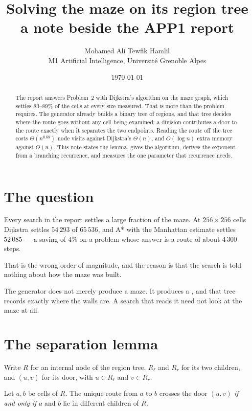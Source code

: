 \documentclass[11pt,a4paper]{article}
\title{Solving the maze on its region tree\\
       \large a note beside the APP1 report}
\author{Mohamed Ali Tewfik Hamlil\\[2pt]
  \small M1 Artificial Intelligence, Universit\'e Grenoble Alpes}
\date{\today}
\begin{document}
\maketitle

\begin{abstract}
The report answers Problem~2 with Dijkstra's algorithm on the maze graph, which
settles $83$--$89\%$ of the cells at every size measured. That is more than the
problem requires. The generator already builds a binary tree of regions, and
that tree decides where the route goes without any cell being examined: a
division contributes a door to the route exactly when it separates the two
endpoints. Reading the route off the tree costs $\Theta(n^{0.68})$ node visits
against Dijkstra's $\Theta(n)$, and $O(\log n)$ extra memory against
$\Theta(n)$. This note states the lemma, gives the algorithm, derives the
exponent from a branching recurrence, and measures the one parameter that
recurrence needs.
\end{abstract}

\section{The question}

Every search in the report settles a large fraction of the maze. At
$256\times256$ cells Dijkstra settles $54\,293$ of $65\,536$, and A* with the
Manhattan estimate settles $52\,085$ --- a saving of $4\%$ on a problem whose
answer is a route of about $4\,300$ steps.

That is the wrong order of magnitude, and the reason is that the search is told
nothing about how the maze was built.

\begin{keypoint}
The generator does not merely produce a maze. It produces a , and that tree records exactly where the walls are. A search that
reads it need not look at the maze at all.
\end{keypoint}

\section{The separation lemma}

Write $R$ for an internal node of the region tree, $R_\ell$ and $R_r$ for its
two children, and $(u,v)$ for its door, with $u\in R_\ell$ and $v\in R_r$.

\begin{proposition}[Separation]
\label{prop:separation}
Let $a,b$ be cells of $R$. The unique route from $a$ to $b$ crosses the door
$(u,v)$ \emph{if and only if} $a$ and $b$ lie in different children of $R$.
\end{proposition}
\end{document}
